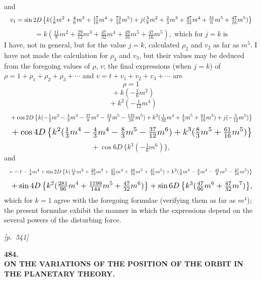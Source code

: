 \documentclass[11pt]{article}
\begin{document}
and
\[
\resizebox{\textwidth}{!}{$\displaystyle v_1=\sin 2D\,\bigl\{k(\tfrac{1}{8}m^2+\tfrac{4}{6}m^3+\tfrac{17}{16}m^4+\tfrac{73}{16}m^5)+j(\tfrac{3}{8}m^2+\tfrac{2}{3}m^3+\tfrac{47}{32}m^4+\tfrac{31}{6}m^5+\tfrac{47}{16}m^5)\bigr\}$}
\]
\[
=k(\tfrac{11}{8}m^2+\tfrac{29}{12}m^3+\tfrac{47}{32}m^4+\tfrac{49}{16}m^5+\tfrac{47}{16}m^5),\;\text{which for}\;j=k\;\text{is}
\]
I have, not in general, but for the value $j=k$, calculated $\rho_2$ and
$v_2$ as far as $m^5$. I have not made the calculation for $\rho_3$ and
$v_3$, but their values may be deduced from the foregoing values of
$\rho$, $v$; the final expressions (when $j=k$) of
$\rho=1+\rho_1+\rho_2+\rho_3+\cdots$ and $v=t+v_1+v_2+v_3+\cdots$ are
\[
\rho=1
\]
\[
\;\;+k(-\tfrac{1}{6}m^2)
\]
\[
\;\;+k^2(-\tfrac{1}{12}m^4)
\]
\[
\resizebox{\textwidth}{!}{$\displaystyle{}+\cos 2D\,\bigl\{k(-\tfrac{1}{2}m^2-\tfrac{4}{3}m^3-\tfrac{37}{8}m^4-\tfrac{43}{3}m^5-\tfrac{135}{16}m^5)+k^2(\tfrac{1}{32}m^4+\tfrac{4}{3}m^5+\tfrac{61}{16}m^5)+j(-\tfrac{5}{12}m^5)\bigr\}$}
\]
\[
\resizebox{\textwidth}{!}{$\displaystyle{}+\cos 4D\,\bigl\{k^2(\tfrac{1}{3}m^4-\tfrac{4}{3}m^4-\tfrac{8}{3}m^5-\tfrac{37}{12}m^6)+k^3(\tfrac{8}{3}m^5+\tfrac{61}{16}m^5)\bigr\}$}
\]
\[
{}+\cos 6D\,\{k^3(-\tfrac{1}{6}m^6)\},
\]
and
\[
\resizebox{\textwidth}{!}{$\displaystyle v=t-\tfrac{1}{4}m^4+\sin 2D\,\bigl\{k(\tfrac{11}{8}m^2+\tfrac{29}{12}m^3+\tfrac{47}{32}m^4+\tfrac{49}{16}m^5+\tfrac{47}{16}m^5)+k^2(\tfrac{1}{8}m^4-\tfrac{4}{3}m^4-\tfrac{43}{8}m^5-\tfrac{27}{16}m^5)\bigr\}$}
\]
\[
\resizebox{\textwidth}{!}{$\displaystyle{}+\sin 4D\,\bigl\{k^2(\tfrac{281}{96}m^4+\tfrac{1199}{144}m^5+\tfrac{47}{32}m^6)\bigr\}+\sin 6D\,\bigl\{k^3(\tfrac{47}{96}m^6+\tfrac{47}{32}m^7)\bigr\},$}
\]
which for $k=1$ agree with the foregoing formulae (verifying them as far
as $m^4$); the present formulae exhibit the manner in which the
expressions depend on the several powers of the disturbing force.


\newpage
\noindent\textit{[p.~541]}

\bigskip

\begin{center}
\textbf{\large 484.}\\[6pt]
\textbf{\Large ON THE VARIATIONS OF THE POSITION OF THE ORBIT IN}\\
\textbf{\Large THE PLANETARY THEORY.}
\end{center}
\end{document}
